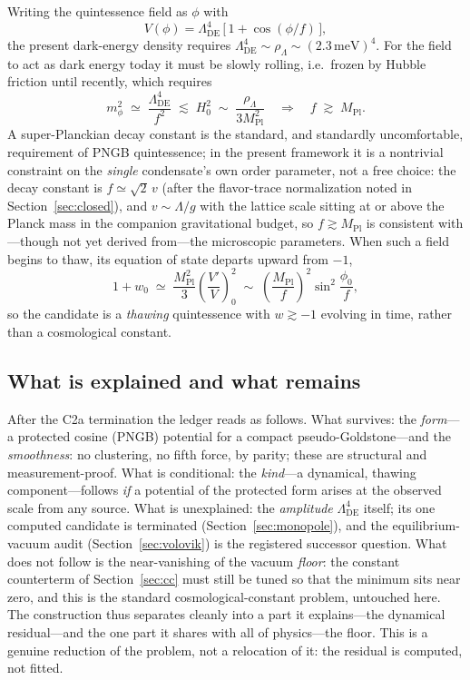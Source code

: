 \documentclass[11pt]{article}
\newcommand{\beq}{\begin{equation}}
\newcommand{\eeq}{\end{equation}}
\newcommand{\Mpl}{M_{\mathrm{Pl}}}
\newcommand{\rhoL}{\rho_\Lambda}
\newcommand{\LDE}{\Lambda_{\mathrm{DE}}}
\begin{document}
Writing the quintessence field as $\phi$ with
\beq
V(\phi) = \Lambda_{\mathrm{DE}}^4\,
\bigl[\,1 + \cos(\phi/f)\,\bigr],
\eeq
the present dark-energy density requires
$\Lambda_{\mathrm{DE}}^4 \sim \rhoL \sim (2.3\,\mathrm{meV})^4$.  For
the field to act as dark energy today it must be slowly rolling,
i.e.\ frozen by Hubble friction until recently, which requires
\beq
m_\phi^2 \;\simeq\; \frac{\Lambda_{\mathrm{DE}}^4}{f^2}
\;\lesssim\; H_0^2 \;\sim\; \frac{\rhoL}{3\Mpl^2}
\quad\Longrightarrow\quad
f \;\gtrsim\; \Mpl .
\eeq
A super-Planckian decay constant is the standard, and standardly
uncomfortable, requirement of PNGB quintessence; in the present
framework it is a nontrivial constraint on the \emph{single}
condensate's own order parameter, not a free choice: the decay
constant is $f \simeq \sqrt{2}\,v$ (after the flavor-trace
normalization noted in Section~\ref{sec:closed}), and
$v \sim \Lambda/g$ with the lattice scale sitting at or above the
Planck mass in the companion gravitational budget, so
$f \gtrsim \Mpl$ is consistent with---though not yet derived
from---the microscopic parameters.  When such a
field begins to thaw, its equation of state departs upward from
$-1$,
\beq
1 + w_0 \;\simeq\; \frac{\Mpl^2}{3}
\left(\frac{V'}{V}\right)^2_{\!0}
\;\sim\; \left(\frac{\Mpl}{f}\right)^2
\sin^2\!\frac{\phi_0}{f},
\eeq
so the candidate is a \emph{thawing} quintessence with $w \gtrsim -1$
evolving in time, rather than a cosmological constant.

\subsection{What is explained and what remains}

After the C2a termination the ledger reads as follows.  What
survives: the \emph{form}---a protected cosine (PNGB) potential for a
compact pseudo-Goldstone---and the \emph{smoothness}: no clustering,
no fifth force, by parity; these are structural and
measurement-proof.  What is conditional: the \emph{kind}---a
dynamical, thawing component---follows \emph{if} a potential of the
protected form arises at the observed scale from any source.  What is
unexplained: the \emph{amplitude} $\LDE^4$ itself; its one computed
candidate is terminated (Section~\ref{sec:monopole}), and the
equilibrium-vacuum audit (Section~\ref{sec:volovik}) is the
registered successor question.  What does not follow is the near-vanishing of the
vacuum \emph{floor}: the constant counterterm of
Section~\ref{sec:cc} must still be tuned so that the minimum sits near
zero, and this is the standard cosmological-constant problem, untouched
here.  The construction thus separates cleanly into a part it
explains---the dynamical residual---and the one part it shares with all
of physics---the floor.  This is a genuine reduction of the problem,
not a relocation of it: the residual is computed, not fitted.
\end{document}
